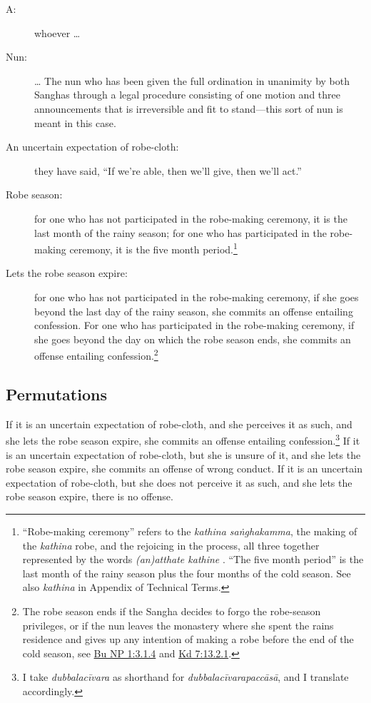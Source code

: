 \documentclass[12pt,openany]{book}%
\begin{document}
\begin{description}%
\item[A: ] whoever … %
\item[Nun: ] … The nun who has been given the full ordination in unanimity by both Sanghas through a legal procedure consisting of one motion and three announcements that is irreversible and fit to stand—this sort of nun is meant in this case. %
\item[An uncertain expectation of robe-cloth: ] they have said, “If we’re able, then we’ll give, then we’ll act.” %
\item[Robe season: ] for one who has not participated in the robe-making ceremony, it is the last month of the rainy season; for one who has participated in the robe-making ceremony, it is the five month period.\footnote{“Robe-making ceremony” refers to the \textit{kathina \textsanskrit{saṅghakamma}}, the making of the \textit{kathina} robe, and the rejoicing in the process, all three together represented by the words \textit{(an)atthate kathine }. “The five month period” is the last month of the rainy season plus the four months of the cold season. See also \textit{kathina} in Appendix of Technical Terms. } %
\item[Lets the robe season expire: ] for one who has not participated in the robe-making ceremony, if she goes beyond the last day of the rainy season, she commits an offense entailing confession. For one who has participated in the robe-making ceremony, if she goes beyond the day on which the robe season ends, she commits an offense entailing confession.\footnote{The robe season ends if the Sangha decides to forgo the robe-season privileges, or if the nun leaves the monastery where she spent the rains residence and gives up any intention of making a robe before the end of the cold season, see \href{https://suttacentral.net/pli-tv-bu-vb-np1/en/brahmali\#3.1.4}{Bu NP 1:3.1.4} and \href{https://suttacentral.net/pli-tv-kd7/en/brahmali\#13.2.1}{Kd 7:13.2.1}. } %
\end{description}

\subsection*{Permutations }

If it is an uncertain expectation of robe-cloth, and she perceives it as such, and she lets the robe season expire, she commits an offense entailing confession.\footnote{I take \textit{\textsanskrit{dubbalacīvara}} as shorthand for \textit{\textsanskrit{dubbalacīvarapaccāsā}}, and I translate accordingly. } If it is an uncertain expectation of robe-cloth, but she is unsure of it, and she lets the robe season expire, she commits an offense of wrong conduct. If it is an uncertain expectation of robe-cloth, but she does not perceive it as such, and she lets the robe season expire, there is no offense. 
\end{document}
